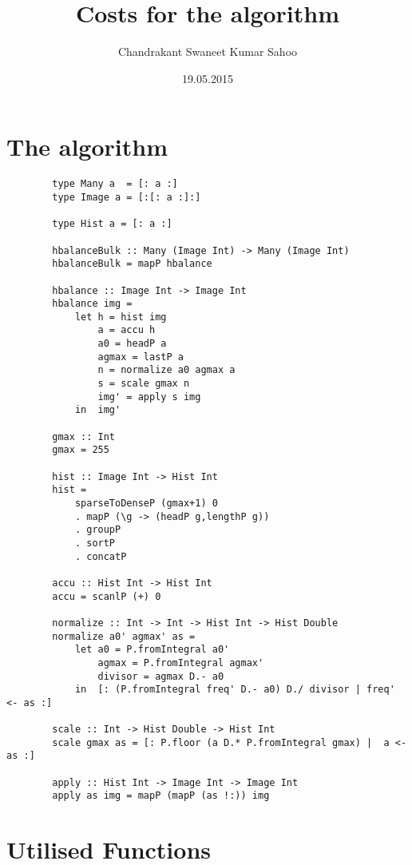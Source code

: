 \documentclass{article}
\title{Costs for the algorithm}
\date{19.05.2015}
\author{Chandrakant Swaneet Kumar Sahoo}
\begin{document}
    
    \section{The algorithm}
      \begin{lstlisting}
        type Many a  = [: a :]
        type Image a = [:[: a :]:]

        type Hist a = [: a :]

        hbalanceBulk :: Many (Image Int) -> Many (Image Int)
        hbalanceBulk = mapP hbalance

        hbalance :: Image Int -> Image Int
        hbalance img =
            let h = hist img
                a = accu h
                a0 = headP a
                agmax = lastP a
                n = normalize a0 agmax a
                s = scale gmax n
                img' = apply s img
            in  img'

        gmax :: Int
        gmax = 255

        hist :: Image Int -> Hist Int
        hist = 
            sparseToDenseP (gmax+1) 0
            . mapP (\g -> (headP g,lengthP g))
            . groupP
            . sortP
            . concatP

        accu :: Hist Int -> Hist Int
        accu = scanlP (+) 0

        normalize :: Int -> Int -> Hist Int -> Hist Double
        normalize a0' agmax' as =
            let a0 = P.fromIntegral a0'
                agmax = P.fromIntegral agmax'
                divisor = agmax D.- a0
            in  [: (P.fromIntegral freq' D.- a0) D./ divisor | freq' <- as :]

        scale :: Int -> Hist Double -> Hist Int
        scale gmax as = [: P.floor (a D.* P.fromIntegral gmax) |  a <- as :]

        apply :: Hist Int -> Image Int -> Image Int
        apply as img = mapP (mapP (as !:)) img
      \end{lstlisting}
    
    \newpage
    
    \section{Utilised Functions}
      
\end{document}
